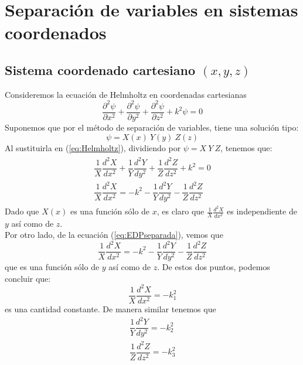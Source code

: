 \section{Separación de variables en sistemas coordenados}
\subsection{Sistema coordenado cartesiano $(x,y,z)$}
Consideremos la ecuación de Helmholtz en coordenadas cartesianas
\begin{equation}
\dfrac{\partial^{2} \psi}{\partial x^{2}} + \dfrac{\partial^{2} \psi}{\partial y^{2}} + \dfrac{\partial^{2} \psi}{\partial z^{2}} + k^{2} \psi = 0
\label{eq:Helmholtz}
\end{equation}
Suponemos que por el método de separación de variables, tiene una solución tipo:
\begin{equation}
\psi = X(x) \: Y(y) \: Z(z)
\end{equation}
Al sustituirla en (\ref{eq:Helmholtz}), dividiendo por $\psi = X \: Y \: Z$, tenemos que:
\begin{align}
\begin{aligned}
\dfrac{1}{X} \dfrac{d^{2} X}{d x^{2}} + \dfrac{1}{Y} \dfrac{d^{2} Y}{d y^{2}} + \dfrac{1}{Z} \dfrac{d^{2} Z}{d z^{2}} + k^{2} = 0 \\
\dfrac{1}{X} \dfrac{d^{2} X}{d x^{2}}  = - k^{2} - \dfrac{1}{Y} \dfrac{d^{2} Y}{d y^{2}} - \dfrac{1}{Z} \dfrac{d^{2} Z}{d z^{2}}
\end{aligned}
\label{eq:EDPseparada}
\end{align}
Dado que $X(x)$ es una función sólo de $x$, es claro que $\frac{1}{X} \frac{d^{2}X}{d x^{2}}$ es independiente de $y$ así como de $z$.
\\
Por otro lado, de la ecuación (\ref{eq:EDPseparada}), vemos que 
\begin{equation}
\dfrac{1}{X} \dfrac{d^{2}X}{d x^{2}} = - k^{2} - \dfrac{1}{Y} \dfrac{d^{2}Y}{dy^{2}} - \dfrac{1}{Z} \dfrac{d^{2}Z}{dz^{2}}
\end{equation}
que es una función sólo de $y$ así como de $z$. De estos dos puntos, podemos concluir que:
\begin{equation}
\dfrac{1}{X} \dfrac{d^{2}X}{d x^{2}} = - k^{2}_{1} \label{eq:EDP_solox}
\end{equation}
es una cantidad constante. De manera similar tenemos que
\begin{eqnarray}
\dfrac{1}{Y} \dfrac{d^{2}Y}{d y^{2}} = - k^{2}_{2} \label{eq:EDP_soloy} \\
\dfrac{1}{Z} \dfrac{d^{2}Z}{d z^{2}} = - k^{2}_{3} \label{eq:EDP_soloz}
\end{eqnarray}
